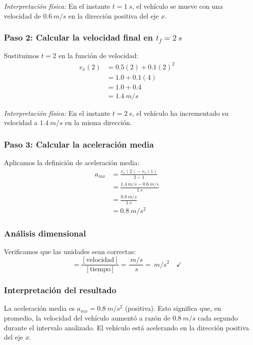 \documentclass[12pt, a4paper]{article}
\begin{document}
\textit{Interpretación física:} En el instante $t = \SI{1}{s}$, el vehículo se mueve con una velocidad de $\SI{0.6}{m/s}$ en la dirección positiva del eje $x$.

\subsubsection*{Paso 2: Calcular la velocidad final en $t_f = \SI{2}{s}$}
Sustituimos $t = 2$ en la función de velocidad:
\begin{align*}
v_x(2) &= 0.5(2) + 0.1(2)^2 \\
&= 1.0 + 0.1(4) \\
&= 1.0 + 0.4 \\
&= \SI{1.4}{m/s}
\end{align*}

\textit{Interpretación física:} En el instante $t = \SI{2}{s}$, el vehículo ha incrementado su velocidad a $\SI{1.4}{m/s}$ en la misma dirección.

\subsubsection*{Paso 3: Calcular la aceleración media}
Aplicamos la definición de aceleración media:
\begin{align*}
a_{mx} &= \frac{v_x(2) - v_x(1)}{2 - 1} \\
&= \frac{\SI{1.4}{m/s} - \SI{0.6}{m/s}}{\SI{1}{s}} \\
&= \frac{\SI{0.8}{m/s}}{\SI{1}{s}} \\
&= \SI{0.8}{m/s^2}
\end{align*}

\subsubsection*{Análisis dimensional}
Verificamos que las unidades sean correctas:
\begin{equation*}
[a_{mx}] = \frac{[\text{velocidad}]}{[\text{tiempo}]} = \frac{\SI{}{m/s}}{\SI{}{s}} = \SI{}{m/s^2} \quad \checkmark
\end{equation*}

\subsubsection*{Interpretación del resultado}
La aceleración media es $a_{mx} = \SI{0.8}{m/s^2}$ (positiva). Esto significa que, en promedio, la velocidad del vehículo aumentó a razón de $\SI{0.8}{m/s}$ cada segundo durante el intervalo analizado. El vehículo está acelerando en la dirección positiva del eje $x$.
\end{document}
